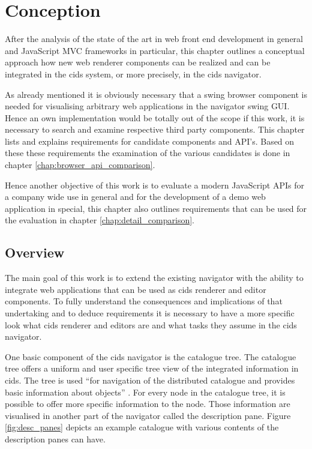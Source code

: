 \chapter{Conception}\label{chap:conception}
After the analysis of the state of the art in web front end development in general and JavaScript MVC frameworks in particular, this chapter outlines a conceptual approach how new web renderer components can be realized and can be integrated in the cids system, or more precisely, in the cids navigator.

As already mentioned it is obviously necessary that a swing browser component is needed for visualising arbitrary web applications in the navigator swing GUI.
Hence an own implementation would be totally out of the scope if  this work, it is necessary to search and examine respective third party components.
This chapter lists and explains requirements for candidate components and API's.
Based on these these requirements the examination of the various candidates is done in chapter \ref{chap:browser_api_comparison}.

Hence another objective of this work is to evaluate a modern JavaScript APIs  for a company wide use in general and for the development of a demo web application in special, this chapter also outlines requirements that can be used for the evaluation in chapter \ref{chap:detail_comparison}. 

\section{Overview}

The main goal of this work is to extend the existing navigator with the ability to integrate web applications that can be used as cids renderer and editor components.
To fully understand the consequences and implications of that undertaking and to deduce requirements it is necessary to have a more specific look what cids renderer and editors are and what tasks they assume in the cids navigator.

One basic component of the cids navigator is the catalogue tree.
The catalogue tree offers a uniform and user specific tree view of the integrated information in cids.
The tree is used \enquote{for navigation of the distributed catalogue and provides basic information about objects} \autocite{cismet-cids-readMe}.
For every node in the catalogue tree, it is possible to offer more specific information to the node.
Those information are visualised in another part of the navigator called the description pane.
Figure \ref{fig:desc_panes} depicts an example catalogue with various contents of the description panes can have. 

